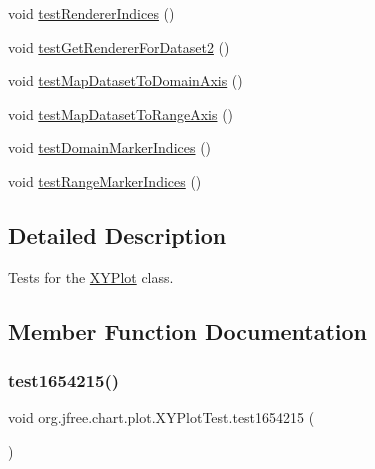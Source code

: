 \begin{DoxyCompactItemize}
\item 
void \mbox{\hyperlink{classorg_1_1jfree_1_1chart_1_1plot_1_1_x_y_plot_test_aecaf8af7f7fda37d58e9f6d864093e2c}{test\+Renderer\+Indices}} ()
\item 
void \mbox{\hyperlink{classorg_1_1jfree_1_1chart_1_1plot_1_1_x_y_plot_test_a93b50f42557ad7e5460accacb4528ce0}{test\+Get\+Renderer\+For\+Dataset2}} ()
\item 
void \mbox{\hyperlink{classorg_1_1jfree_1_1chart_1_1plot_1_1_x_y_plot_test_ad1284c79841e0e917797233aaefafc27}{test\+Map\+Dataset\+To\+Domain\+Axis}} ()
\item 
void \mbox{\hyperlink{classorg_1_1jfree_1_1chart_1_1plot_1_1_x_y_plot_test_abbbc17235d2dbb0df058e301960b506f}{test\+Map\+Dataset\+To\+Range\+Axis}} ()
\item 
void \mbox{\hyperlink{classorg_1_1jfree_1_1chart_1_1plot_1_1_x_y_plot_test_a279d1bd8ae259ceb84b13eeab8462389}{test\+Domain\+Marker\+Indices}} ()
\item 
void \mbox{\hyperlink{classorg_1_1jfree_1_1chart_1_1plot_1_1_x_y_plot_test_aec861ad2e1959205771a39da65f37c41}{test\+Range\+Marker\+Indices}} ()
\end{DoxyCompactItemize}


\subsection{Detailed Description}
Tests for the \mbox{\hyperlink{classorg_1_1jfree_1_1chart_1_1plot_1_1_x_y_plot}{X\+Y\+Plot}} class. 

\subsection{Member Function Documentation}
\mbox{\label{classorg_1_1jfree_1_1chart_1_1plot_1_1_x_y_plot_test_a792db35265fd558bfa5a6b2f47dd4c7c}} 
\subsubsection{\texorpdfstring{test1654215()}{test1654215()}}
{\footnotesize\ttfamily void org.\+jfree.\+chart.\+plot.\+X\+Y\+Plot\+Test.\+test1654215 (\begin{DoxyParamCaption}{ }\end{DoxyParamCaption})}

